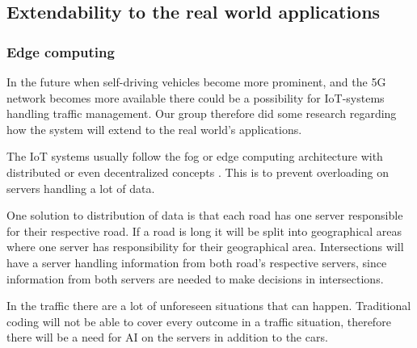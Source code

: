 \subsection{Extendability to the real world applications}
\subsubsection*{Edge computing}
In the future when self-driving vehicles become more prominent, and the 5G network becomes more available there could be a possibility for IoT-systems handling traffic management. Our group therefore did some research regarding how the system will extend to the real world’s applications. 

The IoT systems usually follow the fog or edge computing architecture with distributed or even decentralized concepts \parencite[pp 149]{iot_platforms}. This is to prevent overloading on servers handling a lot of data. 

One solution to distribution of data is that each road has one server responsible for their respective road. If a road is long it will be split into geographical areas where one server has responsibility for their geographical area. Intersections will have a server handling information from both road’s respective servers, since information from both servers are needed to make decisions in intersections.

In the traffic there are a lot of unforeseen situations that can happen. Traditional coding will not be able to cover every outcome in a traffic situation, therefore there will be a need for AI on the servers in addition to the cars. 